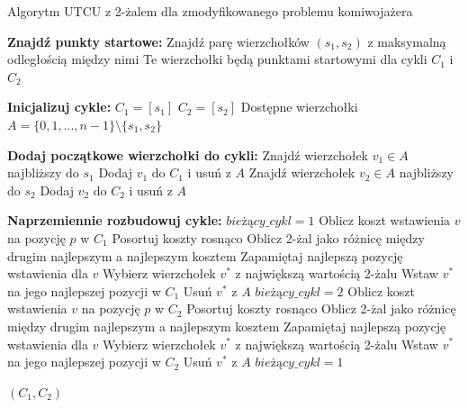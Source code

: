 \documentclass[12pt,a4paper]{article}
\begin{document}
\begin{algorithm}
\caption{Algorytm UTCU z 2-żalem dla zmodyfikowanego problemu komiwojażera}
\label{alg:regret_cycle}
\begin{algorithmic}[1]
\State \textbf{Znajdź punkty startowe:}
\State Znajdź parę wierzchołków $(s_1, s_2)$ z maksymalną odległością między nimi
\State Te wierzchołki będą punktami startowymi dla cykli $C_1$ i $C_2$

\State \textbf{Inicjalizuj cykle:}
\State $C_1 = [s_1]$
\State $C_2 = [s_2]$
\State Dostępne wierzchołki $A = \{0, 1, ..., n-1\} \setminus \{s_1, s_2\}$

\State \textbf{Dodaj początkowe wierzchołki do cykli:}
    \State Znajdź wierzchołek $v_1 \in A$ najbliższy do $s_1$
    \State Dodaj $v_1$ do $C_1$ i usuń z $A$
        \State Znajdź wierzchołek $v_2 \in A$ najbliższy do $s_2$
        \State Dodaj $v_2$ do $C_2$ i usuń z $A$
    \EndIf
\EndIf

\State \textbf{Naprzemiennie rozbudowuj cykle:}
\State $bieżący\_cykl = 1$ 
                \State Oblicz koszt wstawienia $v$ na pozycję $p$ w $C_1$
            \EndFor
            \State Posortuj koszty rosnąco
            \State Oblicz 2-żal jako różnicę między drugim najlepszym a najlepszym kosztem
            \State Zapamiętaj najlepszą pozycję wstawienia dla $v$
        \EndFor
        \State Wybierz wierzchołek $v^*$ z największą wartością 2-żalu
        \State Wstaw $v^*$ na jego najlepszej pozycji w $C_1$
        \State Usuń $v^*$ z $A$
        \State $bieżący\_cykl = 2$
    \Else
                \State Oblicz koszt wstawienia $v$ na pozycję $p$ w $C_2$
            \EndFor
            \State Posortuj koszty rosnąco
            \State Oblicz 2-żal jako różnicę między drugim najlepszym a najlepszym kosztem
            \State Zapamiętaj najlepszą pozycję wstawienia dla $v$
        \EndFor
        \State Wybierz wierzchołek $v^*$ z największą wartością 2-żalu
        \State Wstaw $v^*$ na jego najlepszej pozycji w $C_2$
        \State Usuń $v^*$ z $A$
        \State $bieżący\_cykl = 1$
    \EndIf
\EndWhile

\State \Return $(C_1, C_2)$
\end{algorithmic}
\end{algorithm}
\end{document}
